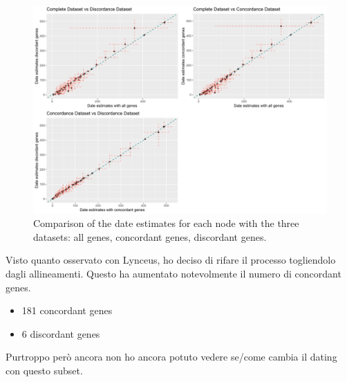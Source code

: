 \begin{figure}[h!]
    \centering
    \includegraphics[width=1\textwidth]{Figures/All_Conc_Disc_scatterplot.png}
    \caption[AllConcDisc Scatterplot]{Comparison of the date estimates for each node with the three datasets: all genes, concordant genes, discordant genes.
}
    \label{fig:topologytest_allspecies}
\end{figure}
Visto quanto osservato con Lynceus, ho deciso di rifare il processo togliendolo dagli allineamenti. Questo ha aumentato notevolmente il numero di concordant genes.
\begin{itemize}
    \item 181 concordant genes
    \item 6 discordant genes
\end{itemize}
Purtroppo però ancora non ho ancora potuto vedere se/come cambia il dating con questo subset.